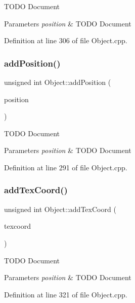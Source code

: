 T\+O\+DO Document 
\begin{DoxyParams}{Parameters}
{\em position} & T\+O\+DO Document \\
\hline
\end{DoxyParams}


Definition at line 306 of file Object.\+cpp.

\mbox{\label{class_object_aed6fb1a005f657408604c2c2c41e7cd1}} 
\subsubsection{\texorpdfstring{add\+Position()}{addPosition()}}
{\footnotesize\ttfamily unsigned int Object\+::add\+Position (\begin{DoxyParamCaption}\item[{\hyperlink{struct_position}{Position}}]{position }\end{DoxyParamCaption})}

T\+O\+DO Document 
\begin{DoxyParams}{Parameters}
{\em position} & T\+O\+DO Document \\
\hline
\end{DoxyParams}


Definition at line 291 of file Object.\+cpp.

\mbox{\label{class_object_af978ee81ebe44916aadc434a84fdf1bf}} 
\subsubsection{\texorpdfstring{add\+Tex\+Coord()}{addTexCoord()}}
{\footnotesize\ttfamily unsigned int Object\+::add\+Tex\+Coord (\begin{DoxyParamCaption}\item[{\hyperlink{struct_tex_coord}{Tex\+Coord}}]{texcoord }\end{DoxyParamCaption})}

T\+O\+DO Document 
\begin{DoxyParams}{Parameters}
{\em position} & T\+O\+DO Document \\
\hline
\end{DoxyParams}


Definition at line 321 of file Object.\+cpp.

